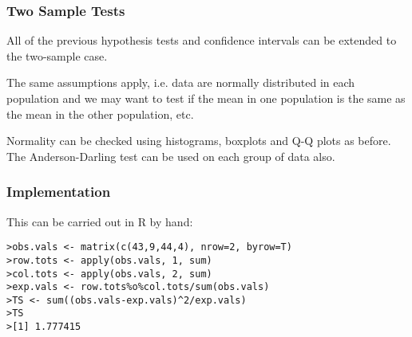 \subsubsection{Two Sample Tests}


All of the previous hypothesis tests and confidence intervals can be
extended to the two-sample case.

The same assumptions apply, i.e. data are normally distributed in
each population and we may want to test if the mean in one
population is the same as the mean in the other population, etc.

Normality can be checked using histograms, boxplots and Q-Q
plots as before. The Anderson-Darling test can be used on
each group of data also.


\subsubsection{Implementation}

This can be carried out in R by hand:

\footnotesize \begin{verbatim}
>obs.vals <- matrix(c(43,9,44,4), nrow=2, byrow=T)
>row.tots <- apply(obs.vals, 1, sum)
>col.tots <- apply(obs.vals, 2, sum)
>exp.vals <- row.tots%o%col.tots/sum(obs.vals)
>TS <- sum((obs.vals-exp.vals)^2/exp.vals)
>TS
>[1] 1.777415
\end{verbatim}\normalsize

